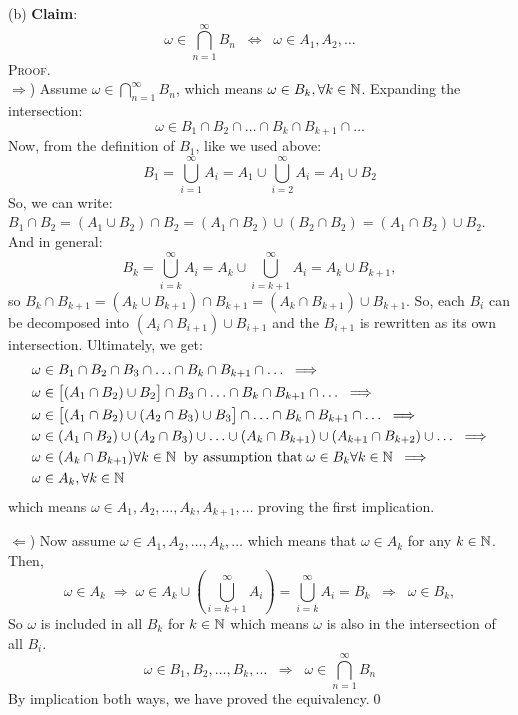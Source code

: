 \newpage\noindent
(b) \textbf{Claim}:
$$
\omega\in \bigcap_{n=1}^\infty B_n
\;\;\Longleftrightarrow\;\;
\omega\in A_1,A_2,\ldots
$$
\textsc{Proof}.\\
$\Rightarrow$) Assume $\omega\in \bigcap_{n=1}^\infty B_n$, which means $\omega\in B_k,\forall k\in\mathbb{N}$. Expanding the intersection:
$$
\omega\in B_1\cap B_2\cap\ldots\cap B_k\cap B_{k+1}\cap\ldots
$$
Now, from the definition of $B_1$, like we used above:
$$
B_1 = \bigcup_{i=1}^\infty A_i = A_1\cup \bigcup_{i=2}^\infty A_i = A_1\cup B_2
$$
So, we can write: $B_1\cap B_2 = (A_1\cup B_2)\cap B_2 = (A_1\cap B_2)\cup(B_2\cap B_2) = (A_1\cap B_2)\cup B_2$.
And in general:
$$
B_k = \bigcup_{i=k}^\infty A_i = A_k\cup \bigcup_{i=k+1}^\infty A_i = A_k\cup B_{k+1},
$$
so $B_k\cap B_{k+1} = (A_k\cup B_{k+1})\cap B_{k+1} = (A_k\cap B_{k+1})\cup B_{k+1}$. So, each $B_i$ can be
decomposed into $(A_i\cap B_{i+1})\cup B_{i+1}$ and the $B_{i+1}$ is rewritten as its own intersection.
Ultimately, we get:
\begin{align*}
    &\omega\in B_1\cap B_2\cap B_3\cap\ldots\cap B_k\cap B_{k+1}\cap\ldots \;\;\Longrightarrow \\
    &\omega\in \big[(A_1\cap B_2)\cup B_2\big]\cap B_3\cap\ldots\cap B_k\cap B_{k+1}\cap\ldots  \;\;\Longrightarrow \\
    &\omega\in \big[(A_1\cap B_2)\cup (A_2\cap B_3)\cup B_3\big]\cap\ldots\cap B_k\cap B_{k+1}\cap\ldots  \;\;\Longrightarrow \\
    &\omega\in (A_1\cap B_2)\cup (A_2\cap B_3)\cup\ldots \cup(A_k\cap B_{k+1})\cup(A_{k+1}\cap B_{k+2})\cup\ldots\;\;\Longrightarrow \\
    &\omega\in (A_k\cap B_{k+1})\forall k\in\mathbb{N} \;\;\text{by assumption that}\; \omega\in B_k\forall k\in\mathbb{N} \;\;\Longrightarrow \\
    &\omega\in A_k,\forall k\in\mathbb{N}
\end{align*}
which means $\omega\in A_1,A_2,\ldots,A_k,A_{k+1},\ldots$ proving the first implication.

\medskip\noindent $\Leftarrow$) Now assume $\omega\in A_1,A_2,\ldots, A_k,\ldots$ which means
that $\omega\in A_k$ for any $k\in\mathbb{N}$. Then,
$$
\omega\in A_k \;\Longrightarrow\; \omega\in A_k\cup\left(\bigcup_{i=k+1}^\infty A_i\right)
= \bigcup_{i=k}^\infty A_i = B_k
\;\;\Longrightarrow\;\;
\omega\in B_k,
$$
So $\omega$ is included in all $B_k$ for $k\in\mathbb{N}$ which means $\omega$ is also in the intersection of all $B_i$.
\[
\omega\in B_1,B_2,\ldots, B_k,\ldots \;\;\Longrightarrow\;\;
\omega\in \bigcap_{n=1}^\infty B_n
\]
By implication both ways, we have proved the equivalency.\qed\\

